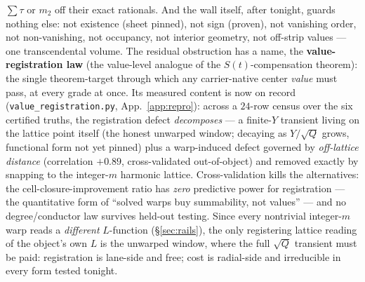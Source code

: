 \documentclass[11pt]{article}
\theoremstyle{definition}
\theoremstyle{remark}
\begin{document}
$\sum\tau$ or $m_2$ off their exact rationals. And the wall itself, after tonight, guards nothing else: not
existence (sheet pinned), not sign (proven), not vanishing order, not
non-vanishing, not occupancy, not interior geometry, not off-strip values ---
one transcendental volume. The residual obstruction has a name, the
\textbf{value-registration law} (the value-level analogue of the
$S(t)$-compensation theorem): the single theorem-target through which any
carrier-native center \emph{value} must pass, at every grade at once. Its
measured content is now on record (\texttt{value\_registration.py},
App.~\ref{app:repro}): across a $24$-row census over the six certified
truths, the registration defect \emph{decomposes} --- a finite-$Y$ transient
living on the lattice point itself (the honest unwarped window; decaying as
$Y/\sqrt Q$ grows, functional form not yet pinned) plus a warp-induced
defect governed by \emph{off-lattice distance} (correlation $+0.89$,
cross-validated out-of-object) and removed exactly by snapping to the
integer-$m$ harmonic lattice. Cross-validation kills the alternatives: the
cell-closure-improvement ratio has \emph{zero} predictive power for
registration --- the quantitative form of ``solved warps buy summability,
not values'' --- and no degree/conductor law survives held-out testing.
Since every nontrivial integer-$m$ warp reads a \emph{different}
$L$-function (\S\ref{sec:rails}), the only registering lattice reading of
the object's own $L$ is the unwarped window, where the full $\sqrt Q$
transient must be paid: registration is lane-side and free; cost is
radial-side and irreducible in every form tested tonight.
\end{document}
